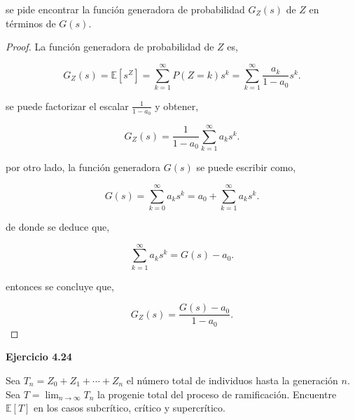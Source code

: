 \documentclass{article}
\begin{document}
se pide encontrar la función generadora de probabilidad \( G_Z(s) \) de \( Z \) en términos de \( G(s) \).

\begin{proof}

La función generadora de probabilidad de \( Z \) es,

\[
G_Z(s) = \mathbb{E}[s^Z] = \sum_{k=1}^\infty P(Z = k) s^k = \sum_{k=1}^\infty \frac{a_k}{1 - a_0} s^k.
\]

se puede factorizar el escalar \( \frac{1}{1 - a_0} \) y obtener,

\[
G_Z(s) = \frac{1}{1 - a_0} \sum_{k=1}^\infty a_k s^k.
\]

por otro lado, la función generadora \( G(s) \) se puede escribir como,

\[
G(s) = \sum_{k=0}^\infty a_k s^k = a_0 + \sum_{k=1}^\infty a_k s^k.
\]

de donde se deduce que,

\[
\sum_{k=1}^\infty a_k s^k = G(s) - a_0.
\]

entonces se concluye que,

\[
G_Z(s) = \frac{G(s) - a_0}{1 - a_0}.
\]

\end{proof} 


\textbf{Ejercicio 4.24}

Sea \( T_n = Z_0 + Z_1 + \cdots + Z_n \) el número total de individuos hasta la generación \( n \). Sea \( T = \lim_{n \to \infty} T_n \) la progenie total del proceso de ramificación. Encuentre \( \mathbb{E}[T] \) en los casos subcrítico, crítico y supercrítico.
\end{document}
